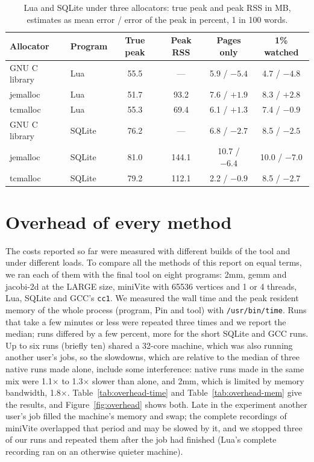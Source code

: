 \documentclass[11pt]{article}
\newcommand{\figref}[1]{Figure~\ref{#1}}
\newcommand{\tabref}[1]{Table~\ref{#1}}
\begin{document}
\begin{table}[t]
\centering
\small
\caption{Lua and SQLite under three allocators: true peak and peak RSS in MB, estimates as mean error / error of the peak in percent, 1 in 100 words.}
\label{tab:allocators}
\begin{tabular}{llcccc}
\toprule
Allocator & Program & True peak & Peak RSS & Pages only & 1\% watched \\
\midrule
GNU C library & Lua & 55.5 & --- & 5.9 / $-5.4$ & 4.7 / $-4.8$ \\
jemalloc & Lua & 51.7 & 93.2 & 7.6 / $+1.9$ & 8.3 / $+2.8$ \\
tcmalloc & Lua & 55.3 & 69.4 & 6.1 / $+1.3$ & 7.4 / $-0.9$ \\
GNU C library & SQLite & 76.2 & --- & 6.8 / $-2.7$ & 8.5 / $-2.5$ \\
jemalloc & SQLite & 81.0 & 144.1 & 10.7 / $-6.4$ & 10.0 / $-7.0$ \\
tcmalloc & SQLite & 79.2 & 112.1 & 2.2 / $-0.9$ & 8.5 / $-2.7$ \\
\bottomrule
\end{tabular}
\end{table}

\section{Overhead of every method}
\label{sec:overhead}

The costs reported so far were measured with different builds of the tool and under different loads. To compare all the methods of this report on equal terms, we ran each of them with the final tool on eight programs: 2mm, gemm and jacobi-2d at the LARGE size, miniVite with 65536 vertices and 1 or 4 threads, Lua, SQLite and GCC's \texttt{cc1}. We measured the wall time and the peak resident memory of the whole process (program, Pin and tool) with \texttt{/usr/bin/time}. Runs that take a few minutes or less were repeated three times and we report the median; runs differed by a few percent, more for the short SQLite and GCC runs. Up to six runs (briefly ten) shared a 32-core machine, which was also running another user's jobs, so the slowdowns, which are relative to the median of three native runs made alone, include some interference: native runs made in the same mix were 1.1$\times$ to 1.3$\times$ slower than alone, and 2mm, which is limited by memory bandwidth, 1.8$\times$. \tabref{tab:overhead-time} and \tabref{tab:overhead-mem} give the results, and \figref{fig:overhead} shows both. Late in the experiment another user's job filled the machine's memory and swap; the complete recordings of miniVite overlapped that period and may be slowed by it, and we stopped three of our runs and repeated them after the job had finished (Lua's complete recording ran on an otherwise quieter machine).
\end{document}
